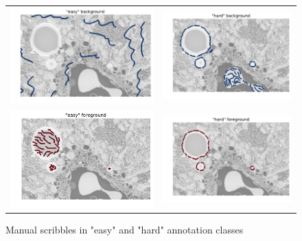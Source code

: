 \begin{figure}[h!] \label{fig:scribbles}
\begin{tabular}{cc}
 \includegraphics[width=0.5\linewidth]{figures/easy_bg.pdf} & \includegraphics[width=0.5\linewidth]{figures/hard_bg.pdf} \\
 \includegraphics[width=0.5\linewidth]{figures/easy_fg.pdf} & \includegraphics[width=0.5\linewidth]{figures/hard_fg.pdf} \\ 
\end{tabular}
\caption{Manual scribbles in "easy" and "hard" annotation classes}
\end{figure}

